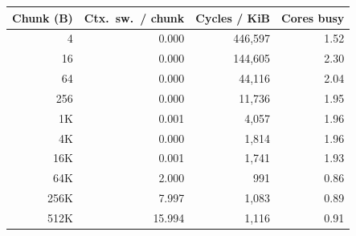 \begin{tabular}{@{}rrrr@{}}
\toprule
Chunk (B) & Ctx.\ sw.\ / chunk & Cycles / KiB & Cores busy \\
\midrule
4 & 0.000 & 446{,}597 & 1.52 \\
16 & 0.000 & 144{,}605 & 2.30 \\
64 & 0.000 & 44{,}116 & 2.04 \\
256 & 0.000 & 11{,}736 & 1.95 \\
1K & 0.001 & 4{,}057 & 1.96 \\
4K & 0.000 & 1{,}814 & 1.96 \\
16K & 0.001 & 1{,}741 & 1.93 \\
64K & 2.000 & 991 & 0.86 \\
256K & 7.997 & 1{,}083 & 0.89 \\
512K & 15.994 & 1{,}116 & 0.91 \\
\bottomrule
\end{tabular}
